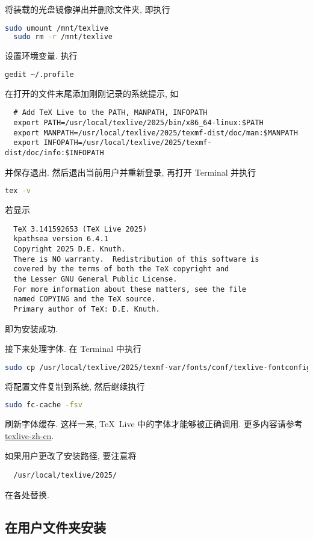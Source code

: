 将装载的光盘镜像弹出并删除文件夹,
即执行
\begin{lstlisting}[language = bash]
  sudo umount /mnt/texlive
  sudo rm -r /mnt/texlive
\end{lstlisting}

设置环境变量.
执行
\begin{lstlisting}[language = bash]
  gedit ~/.profile
\end{lstlisting}
在打开的文件末尾添加刚刚记录的系统提示,
如
\begin{lstlisting}
  # Add TeX Live to the PATH, MANPATH, INFOPATH
  export PATH=/usr/local/texlive/2025/bin/x86_64-linux:$PATH
  export MANPATH=/usr/local/texlive/2025/texmf-dist/doc/man:$MANPATH
  export INFOPATH=/usr/local/texlive/2025/texmf-dist/doc/info:$INFOPATH
\end{lstlisting}
并保存退出.
然后退出当前用户并重新登录,
再打开 \textsf{Terminal} 并执行
\begin{lstlisting}[language=bash]
  tex -v
\end{lstlisting}
若显示
\begin{lstlisting}
  TeX 3.141592653 (TeX Live 2025)
  kpathsea version 6.4.1
  Copyright 2025 D.E. Knuth.
  There is NO warranty.  Redistribution of this software is
  covered by the terms of both the TeX copyright and
  the Lesser GNU General Public License.
  For more information about these matters, see the file
  named COPYING and the TeX source.
  Primary author of TeX: D.E. Knuth.
\end{lstlisting}
即为安装成功.

接下来处理字体.
在 \textsf{Terminal} 中执行
\begin{lstlisting}[language=bash]
  sudo cp /usr/local/texlive/2025/texmf-var/fonts/conf/texlive-fontconfig.conf /etc/fonts/conf.d/09-texlive.conf
\end{lstlisting}
将配置文件复制到系统,
然后继续执行
\begin{lstlisting}[language=bash]
  sudo fc-cache -fsv
\end{lstlisting}
刷新字体缓存.
这样一来, \TeX\ Live 中的字体才能够被正确调用.
更多内容请参考 \href{https://tug.org/texlive/doc/texlive-zh-cn/texlive-zh-cn.pdf}{texlive-zh-cn}.

如果用户更改了安装路径,
要注意将
\begin{lstlisting}
  /usr/local/texlive/2025/
\end{lstlisting}
在各处替换.

\subsection{在用户文件夹安装}\label{subsec:ubuntu-user-folder}

